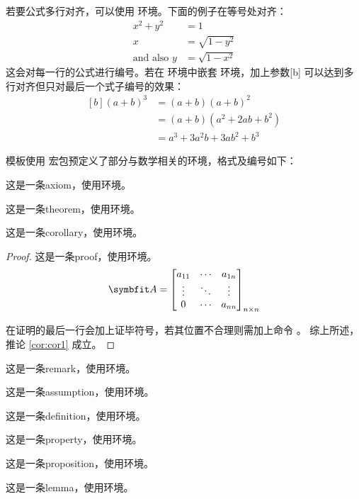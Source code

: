 若要公式多行对齐，可以使用  环境。下面的例子在等号处对齐：
\begin{align}
	x^2 + y^2 & = 1            \\
	x         & = \sqrt{1-y^2} \\\text{and also }
	y         & =\sqrt{1-x^2}
\end{align}
这会对每一行的公式进行编号。若在  环境中嵌套  环境，加上参数[b]
可以达到多行对齐但只对最后一个式子编号的效果：
\begin{equation}
	\begin{aligned}[b]
		(a + b)^3   & = (a + b) (a + b)^2         \\
					& = (a + b)(a^2 + 2ab + b^2)  \\
					& = a^3 + 3a^2b + 3ab^2 + b^3
	\end{aligned}
\end{equation}

模板使用  宏包预定义了部分与数学相关的环境，格式及编号如下：
\begin{axiom}
	这是一条axiom，使用环境。
\end{axiom}
\begin{theorem}[某某定理]   %
	这是一条theorem，使用环境。
\end{theorem}
\begin{corollary}[一条推论]\label{cor:cor1}
	这是一条corollary，使用环境。
\end{corollary}
\begin{proof}
	这是一条proof，使用环境。
	\[
		\Matrix{A}=\begin{bmatrix}
			a_{11} & \cdots  & a_{1n} \\
			\vdots & \ddots & \vdots \\
			0      & \cdots & a_{nn}
		\end{bmatrix}_{n\times n}
	\]

	在证明的最后一行会加上证毕符号，若其位置不合理则需加上命令 。
	综上所述，推论 \ref{cor:cor1} 成立。
\end{proof}
\begin{remark}
	这是一条remark，使用环境。
\end{remark}
\begin{assumption}
	这是一条assumption，使用环境。
\end{assumption}
\begin{definition}
	这是一条definition，使用环境。
\end{definition}
\begin{property}
	这是一条property，使用环境。
\end{property}
\begin{proposition}
	这是一条proposition，使用环境。
\end{proposition}
\begin{lemma}
	这是一条lemma，使用环境。
\end{lemma}

